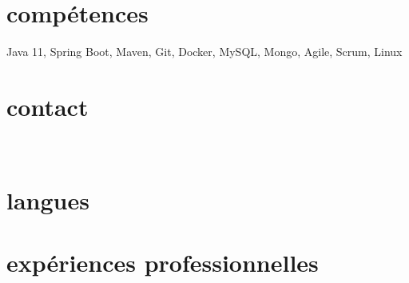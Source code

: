 \documentclass{friggeri-cv} 	%
\begin{document}


\begin{aside} %
\section{compétences}
Java 11, Spring Boot,
Maven, Git, Docker,
MySQL, Mongo,
Agile, Scrum,
Linux
\section{contact}
\myAddress
~
\myPhoneNumber
\myReferences
\section{langues}
\myLanguages
\end{aside}

\section{expériences professionnelles}
\end{document}
